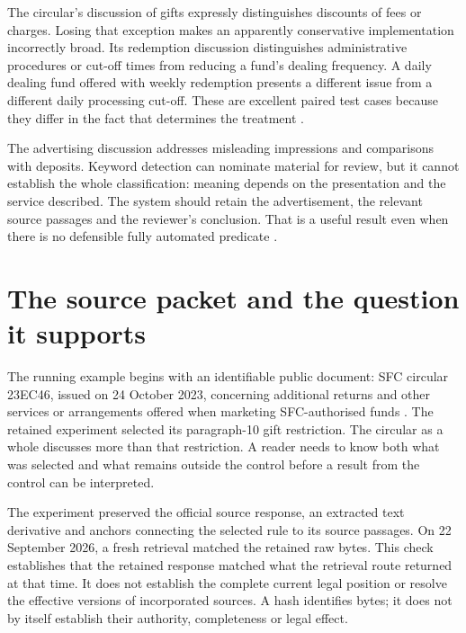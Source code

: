 The circular's discussion of gifts expressly distinguishes discounts of fees or
charges. Losing that exception makes an apparently conservative implementation
incorrectly broad. Its redemption discussion distinguishes administrative
procedures or cut-off times from reducing a fund's dealing frequency. A daily
dealing fund offered with weekly redemption presents a different issue from a
different daily processing cut-off. These are excellent paired test cases because
they differ in the fact that determines the treatment
\citep[paras.~9--14]{sfcmarketing}.

The advertising discussion addresses misleading impressions and comparisons with
deposits. Keyword detection can nominate material for review, but it cannot
establish the whole classification: meaning depends on the presentation and the
service described. The system should retain the advertisement, the relevant
source passages and the reviewer's conclusion. That is a useful result even when
there is no defensible fully automated predicate
\citep[paras.~15--17]{sfcmarketing}.

\section{The source packet and the question it supports}
\label{merge:M02:00}

\label{sec:circular-packet}
The running example begins with an identifiable public document: SFC circular
23EC46, issued on 24 October 2023, concerning additional returns and other
services or arrangements offered when marketing SFC-authorised funds
\citep{sfcmarketing}. The retained experiment selected its paragraph-10 gift
restriction. The circular as a whole discusses more than that restriction. A
reader needs to know both what was selected and what remains outside the control
before a result from the control can be interpreted.

The experiment preserved the official source response, an extracted text
derivative and anchors connecting the selected rule to its source passages.
On 22 September 2026, a fresh retrieval matched the retained raw bytes. This
check establishes that the retained response matched what the retrieval route
returned at that time. It does not establish the complete current legal position
or resolve the effective versions of incorporated sources. A hash identifies
bytes; it does not by itself establish their authority, completeness or legal
effect.


